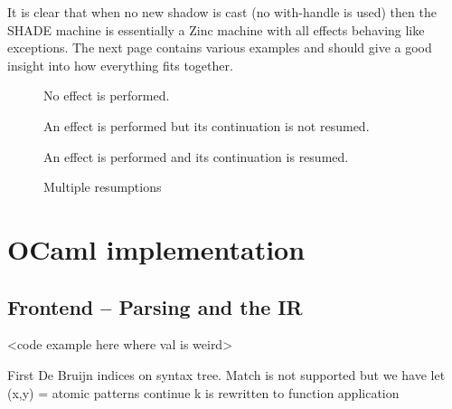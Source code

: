 \documentclass[class=article, crop=false]{standalone}
\begin{document}
It is clear that when no new shadow is cast (no with-handle is used) then the SHADE machine is essentially a Zinc machine with
all effects behaving like exceptions. The next page contains various examples and should give a good insight
into how everything fits together.

\begin{figure}

    \caption{No effect is performed.}
    \label{fig:shadecode-no-effect}
\end{figure}

\begin{figure}

    \caption{An effect is performed but its continuation is not resumed.}
    \label{fig:shadecode-exception}
\end{figure}


\begin{wrapfigure}{r}{0.5\textwidth}
    \begin{center}
    \end{center}
    \caption{An effect is performed and its continuation is resumed.}
    \label{fig:shadecode-one-resume}
\end{wrapfigure}
 
\begin{landscape}
    \begin{figure}
        \centering
        \caption{Multiple resumptions}
        \label{fig:shadecode-two-resume}
    \end{figure}
\end{landscape}


\section{OCaml implementation}

\subsection{Frontend -- Parsing and the IR}

<code example here where val is weird>

First De Bruijn indices on syntax tree.
Match is not supported but we have let (x,y) =
atomic patterns
continue k is rewritten to function application
\end{document}
